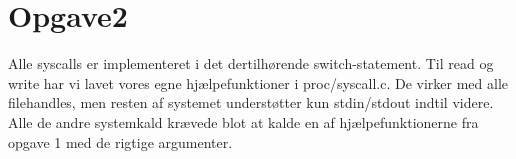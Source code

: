 \section{Opgave2}
Alle syscalls er implementeret i det dertilhørende switch-statement. Til read og write har vi lavet vores egne hjælpefunktioner i proc/syscall.c. De virker med alle filehandles, men resten af systemet understøtter kun stdin/stdout indtil videre. Alle de andre systemkald krævede blot at kalde en af hjælpefunktionerne fra opgave 1 med de rigtige argumenter.
